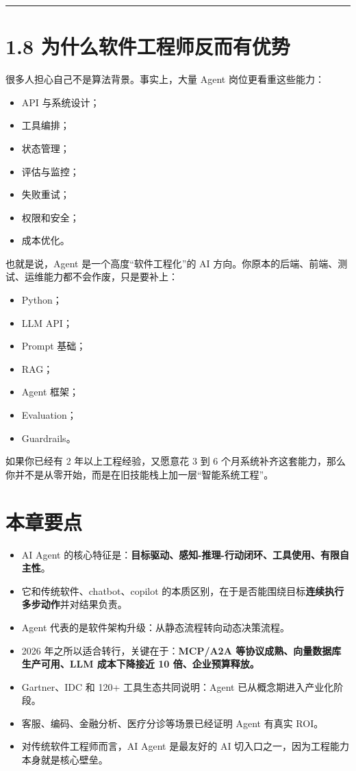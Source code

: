 \bigskip\hrule\bigskip

\section{1.8 为什么软件工程师反而有优势}

很多人担心自己不是算法背景。事实上，大量 Agent 岗位更看重这些能力：


\begin{itemize}[leftmargin=2em]
\item API 与系统设计；
\item 工具编排；
\item 状态管理；
\item 评估与监控；
\item 失败重试；
\item 权限和安全；
\item 成本优化。
\end{itemize}

也就是说，Agent 是一个高度``软件工程化''的 AI 方向。你原本的后端、前端、测试、运维能力都不会作废，只是要补上：


\begin{itemize}[leftmargin=2em]
\item Python；
\item LLM API；
\item Prompt 基础；
\item RAG；
\item Agent 框架；
\item Evaluation；
\item Guardrails。
\end{itemize}

如果你已经有 2 年以上工程经验，又愿意花 3 到 6 个月系统补齐这套能力，那么你并不是从零开始，而是在旧技能栈上加一层``智能系统工程''。


\section{本章要点}

\begin{itemize}[leftmargin=2em]
\item AI Agent 的核心特征是：\textbf{目标驱动、感知-推理-行动闭环、工具使用、有限自主性}。
\item 它和传统软件、chatbot、copilot 的本质区别，在于是否能围绕目标\textbf{连续执行多步动作}并对结果负责。
\item Agent 代表的是软件架构升级：从静态流程转向动态决策流程。
\item 2026 年之所以适合转行，关键在于：\textbf{MCP/A2A 等协议成熟、向量数据库生产可用、LLM 成本下降接近 10 倍、企业预算释放。}
\item Gartner、IDC 和 120+ 工具生态共同说明：Agent 已从概念期进入产业化阶段。
\item 客服、编码、金融分析、医疗分诊等场景已经证明 Agent 有真实 ROI。
\item 对传统软件工程师而言，AI Agent 是最友好的 AI 切入口之一，因为工程能力本身就是核心壁垒。
\end{itemize}

